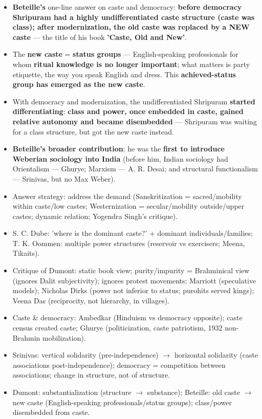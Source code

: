 \begin{KeyConcept}
\begin{itemize}
\item \textbf{Beteille's} one-line answer on caste and democracy: \textbf{before democracy Shripuram had a highly undifferentiated caste structure (caste was class); after modernization, the old caste was replaced by a NEW caste} --- the title of his book \textbf{'Caste, Old and New'}.
\item The \textbf{new caste} = \textbf{status groups} --- English-speaking professionals for whom \textbf{ritual knowledge is no longer important}; what matters is party etiquette, the way you speak English and dress. This \textbf{achieved-status group has emerged as the new caste}.
\item With democracy and modernization, the undifferentiated Shripuram \textbf{started differentiating}: \textbf{class and power, once embedded in caste, gained relative autonomy and became disembedded} --- Shripuram was waiting for a class structure, but got the new caste instead.
\item \textbf{Beteille's broader contribution}: he was the \textbf{first to introduce Weberian sociology into India} (before him, Indian sociology had Orientalism --- Ghurye; Marxism --- A. R. Desai; and structural functionalism --- Srinivas, but no Max Weber).
\end{itemize}
\end{KeyConcept}

\begin{QuickRevision}
\begin{itemize}
\item Answer strategy: address the demand (Sanskritization = sacred/mobility within caste/low castes; Westernization = secular/mobility outside/upper castes; dynamic relation; Yogendra Singh's critique).
\item S. C. Dube: 'where is the dominant caste?' + dominant individuals/families; T. K. Oommen: multiple power structures (reservoir vs exercisers; Meena, Tikaits).
\item Critique of Dumont: static book view; purity/impurity = Brahminical view (ignores Dalit subjectivity); ignores protest movements; Marriott (speculative models); Nicholas Dirks (power not inferior to status; purohits served kings); Veena Das (reciprocity, not hierarchy, in villages).
\item Caste \& democracy: Ambedkar (Hinduism vs democracy opposite); caste census created caste; Ghurye (politicization, caste patriotism, 1932 non-Brahmin mobilization).
\item Srinivas: vertical solidarity (pre-independence) $\rightarrow$ horizontal solidarity (caste associations post-independence); democracy = competition between associations; change in structure, not of structure.
\item Dumont: substantialization (structure $\rightarrow$ substance); Beteille: old caste $\rightarrow$ new caste (English-speaking professionals/status groups); class/power disembedded from caste.
\end{itemize}
\end{QuickRevision}

